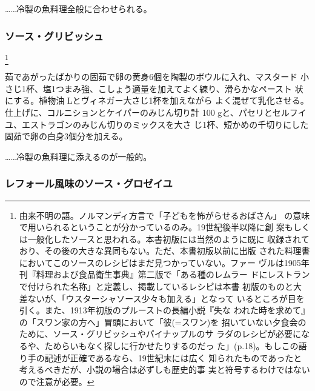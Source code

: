 \begin{recette}
\ldots{}\ldots{}冷製の魚料理全般に合わせられる。

\maeaki

\hypertarget{sauce-gribiche}{%
\subsubsection{ソース・グリビッシュ}\label{sauce-gribiche}}

\footnote{由来不明の語。ノルマンディ方言で「子どもを怖がらせるおばさん」
  の意味で用いられるということが分かっているのみ。19世紀後半以降に創
  案もしくは一般化したソースと思われる。本書初版には当然のように既に
  収録されており、その後の大きな異同もない。ただ、本書初版以前に出版
  された料理書においてこのソースのレシピはまだ見つかっていない。ファー
  ヴルは1905年刊『料理および食品衛生事典』第二版で「ある種のレムラー
  ドにレストランで付けられた名称」と定義し、掲載しているレシピは本書
  初版のものと大差ないが、「ウスターシャソース少々も加える」となって
  いるところが目を引く。また、1913年初版のプルーストの長編小説『失な
  われた時を求めて』の「スワン家の方へ」冒頭において「彼(=スワン)を
  招いていない夕食会のために、ソース・グリビッシュやパイナップルのサ
  ラダのレシピが必要になるや、ためらいもなく探しに行かせたりするのだっ
  た」(p.18)。もしこの語り手の記述が正確であるなら、19世紀末には広く
  知られたものであったと考えるべきだが、小説の場合は必ずしも歴史的事
  実と符号するわけではないので注意が必要。}


茹であがったばかりの固茹で卵の黄身6個を陶製のボウルに入れ、マスタード
小さじ1杯、塩1つまみ強、こしょう適量を加えてよく練り、滑らかなペースト
状にする。植物油\undemi{} Lとヴィネガー大さじ1\undemi{}杯を加えながら
よく混ぜて乳化させる。仕上げに、コルニションとケイパーのみじん切り計 100
gと、パセリとセルフイユ、エストラゴンのみじん切りのミックスを大さ
じ1杯、短かめの千切りにした固茹で卵の白身3個分を加える。

\ldots{}\ldots{}冷製の魚料理に添えるのが一般的。

\maeaki

\hypertarget{sauce-groseilles-au-raifort}{%
\subsubsection{レフォール風味のソース・グロゼイユ}\label{sauce-groseilles-au-raifort}}


\end{recette}

